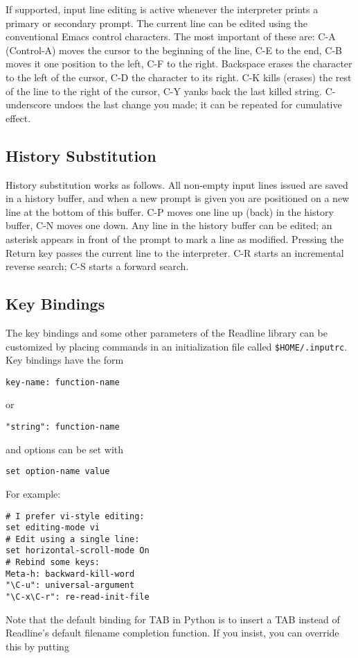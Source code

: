 If supported, input line editing is active whenever the interpreter
prints a primary or secondary prompt.  The current line can be edited
using the conventional Emacs control characters.  The most important
of these are: C-A (Control-A) moves the cursor to the beginning of the
line, C-E to the end, C-B moves it one position to the left, C-F to
the right.  Backspace erases the character to the left of the cursor,
C-D the character to its right.  C-K kills (erases) the rest of the
line to the right of the cursor, C-Y yanks back the last killed
string.  C-underscore undoes the last change you made; it can be
repeated for cumulative effect.

\subsection{History Substitution}

History substitution works as follows.  All non-empty input lines
issued are saved in a history buffer, and when a new prompt is given
you are positioned on a new line at the bottom of this buffer.  C-P
moves one line up (back) in the history buffer, C-N moves one down.
Any line in the history buffer can be edited; an asterisk appears in
front of the prompt to mark a line as modified.  Pressing the Return
key passes the current line to the interpreter.  C-R starts an
incremental reverse search; C-S starts a forward search.

\subsection{Key Bindings}

The key bindings and some other parameters of the Readline library can
be customized by placing commands in an initialization file called
{\tt \$HOME/.inputrc}.  Key bindings have the form

\bcode\begin{verbatim}
key-name: function-name
\end{verbatim}\ecode
%
or

\bcode\begin{verbatim}
"string": function-name
\end{verbatim}\ecode
%
and options can be set with

\bcode\begin{verbatim}
set option-name value
\end{verbatim}\ecode
%
For example:

\bcode\begin{verbatim}
# I prefer vi-style editing:
set editing-mode vi
# Edit using a single line:
set horizontal-scroll-mode On
# Rebind some keys:
Meta-h: backward-kill-word
"\C-u": universal-argument
"\C-x\C-r": re-read-init-file
\end{verbatim}\ecode
%
Note that the default binding for TAB in Python is to insert a TAB
instead of Readline's default filename completion function.  If you
insist, you can override this by putting

